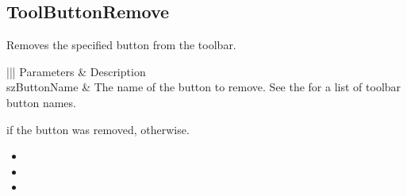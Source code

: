 \documentclass[letterpaper,12pt,english,openany,oneside]{sphinxmanual}
\begin{document}
\subsection{ToolButtonRemove}
\label{\detokenize{IAC_API_OLE_Objects:toolbuttonremove}}
Removes the specified button from the toolbar.


\begin{sphinxVerbatim}[commandchars=\\\{\}]
  
\end{sphinxVerbatim}
\label{\detokenize{IAC_API_OLE_Objects:parameters-17}}


\begin{savenotes}\sphinxattablestart
\centering
{}\label{\detokenize{IAC_API_OLE_Objects:section-19}}\nobreak
\begin{tabular}[t]{|||}
\hline
\sphinxstyletheadfamily 
Parameters
&\sphinxstyletheadfamily 
Description
\\
\hline
szButtonName
&
The name of the button to remove. See the  for a list of toolbar button names.
\\
\hline
\end{tabular}
\par
\sphinxattableend\end{savenotes}


 if the button was removed,  otherwise.

\label{\detokenize{IAC_API_OLE_Objects:related-methods-25}}
\begin{itemize}
\item {} 
 

\item {} 
 

\item {} 
 

\end{itemize}
\end{document}
